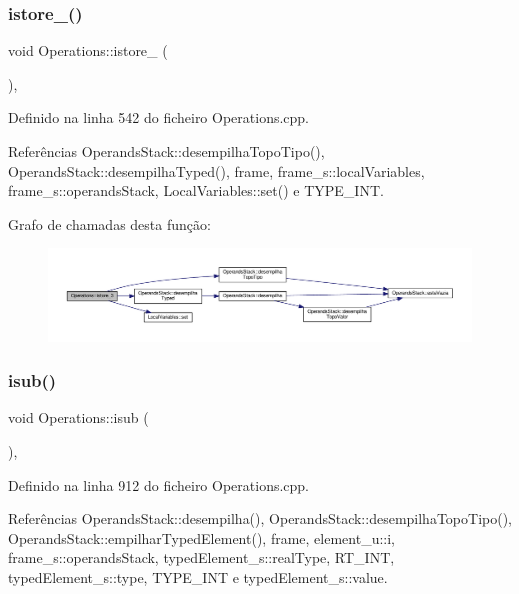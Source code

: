 \subsubsection{\texorpdfstring{istore\+\_()}{istore\_3()}}
{\footnotesize\ttfamily void Operations\+::istore\+\_ (\begin{DoxyParamCaption}{ }\end{DoxyParamCaption})\hspace{0.3cm}{\ttfamily [static]}, {\ttfamily [private]}}



Definido na linha 542 do ficheiro Operations.\+cpp.



Referências Operands\+Stack\+::desempilha\+Topo\+Tipo(), Operands\+Stack\+::desempilha\+Typed(), frame, frame\+\_\+s\+::local\+Variables, frame\+\_\+s\+::operands\+Stack, Local\+Variables\+::set() e T\+Y\+P\+E\+\_\+\+I\+NT.

Grafo de chamadas desta função\+:\nopagebreak
\begin{figure}[H]
\begin{center}
\leavevmode
\includegraphics[width=350pt]{classOperations_a3ff20f0475eaaa28501ea330074f5cb7_cgraph}
\end{center}
\end{figure}
\mbox{\label{classOperations_ab2808e99336de64fefb2a9073bc251de}} 
\subsubsection{\texorpdfstring{isub()}{isub()}}
{\footnotesize\ttfamily void Operations\+::isub (\begin{DoxyParamCaption}{ }\end{DoxyParamCaption})\hspace{0.3cm}{\ttfamily [static]}, {\ttfamily [private]}}



Definido na linha 912 do ficheiro Operations.\+cpp.



Referências Operands\+Stack\+::desempilha(), Operands\+Stack\+::desempilha\+Topo\+Tipo(), Operands\+Stack\+::empilhar\+Typed\+Element(), frame, element\+\_\+u\+::i, frame\+\_\+s\+::operands\+Stack, typed\+Element\+\_\+s\+::real\+Type, R\+T\+\_\+\+I\+NT, typed\+Element\+\_\+s\+::type, T\+Y\+P\+E\+\_\+\+I\+NT e typed\+Element\+\_\+s\+::value.

